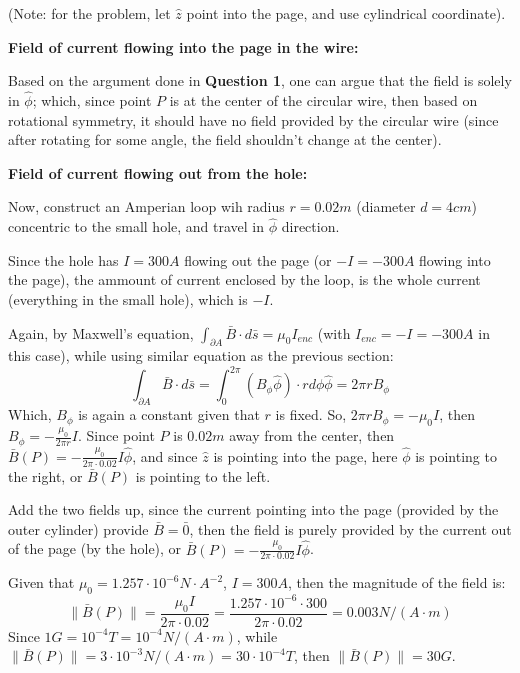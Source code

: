 \documentclass{article}
\begin{document}
(Note: for the problem, let $\hat{z}$ point into the page, and use cylindrical coordinate).

\hfill

\textbf{Field of current flowing into the page in the wire:}

Based on the argument done in \textbf{Question 1}, one can argue that the field is solely in $\hat{\phi}$; which, since point $P$ is at the center
of the circular wire, then based on rotational symmetry, it should have no field provided by the circular wire (since after rotating for some angle,
the field shouldn't change at the center).

\hfill

\textbf{Field of current flowing out from the hole:}

Now, construct an Amperian loop wih radius $r= 0.02 m$ (diameter $d= 4 cm$) concentric to the small hole, and travel in $\hat{\phi}$ direction.

Since the hole has $I=300A$ flowing out the page (or $-I=-300A$ flowing into the page), the ammount of current enclosed by the loop,
is the whole current (everything in the small hole), which is $-I$.

Again, by Maxwell's equation, $\int_{\partial A}\bar{B}\cdot d\bar{s}=\mu_0 I_{enc}$ (with $I_{enc}=-I=-300A$ in this case), while using similar equation as the previous section:
$$\int_{\partial A}\bar{B}\cdot d\bar{s}=\int_{0}^{2\pi}(B_\phi\hat{\phi})\cdot rd\phi \hat{\phi} = 2\pi r B_\phi$$
Which, $B_\phi$ is again a constant given that $r$ is fixed. So, $2\pi rB_\phi = -\mu_0I$, then $B_\phi = -\frac{\mu_0}{2\pi r}I$.
Since point $P$ is $0.02m$ away from the center, then $\bar{B}(P)=-\frac{\mu_0}{2\pi \cdot 0.02}I\hat{\phi}$, and since $\hat{z}$ is pointing into the page,
here $\hat{\phi}$ is pointing to the right, or $\bar{B}(P)$ is pointing to the left.

\hfill

Add the two fields up, since the current pointing into the page (provided by the outer cylinder) provide $\bar{B}=\bar{0}$, then the field is purely provided by the current out of the page (by the hole), or $\bar{B}(P)=-\frac{\mu_0}{2\pi \cdot 0.02}I\hat{\phi}$.

Given that $\mu_0=1.257\cdot 10^{-6}N\cdot A^{-2}$, $I=300A$, then the magnitude of the field is:
$$\|\bar{B}(P)\|=\frac{\mu_0I}{2\pi\cdot 0.02} = \frac{1.257\cdot 10^{-6}\cdot 300}{2\pi \cdot 0.02} = 0.003 N/(A\cdot m)$$
Since $1G = 10^{-4}T = 10^{-4}N/(A\cdot m)$, while $\|\bar{B}(P)\| = 3\cdot 10^{-3} N/(A\cdot m)=30 \cdot 10^{-4}T$,
then $\|\bar{B}(P)\| = 30G$.
\end{document}

